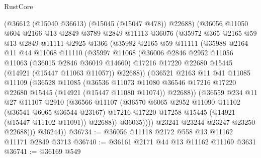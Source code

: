 \begin{lexlean}{RustCore}
\begin{coremodule}
          (@36612 (@15040 @36613) (@15045 (@15047 @478)) @22688)
          (@36056
            @11050
            @604
            @2166
            @13
            @2849
            @3789
            @2849
            @11113
            @36076
            (@35972
              @365
              @2165
              @59
              @13
              @2849
              @11111
              @2925
              @1366
              (@35982
                @2165
                @59
                @11111
                (@35988
                  @2164
                  @11
                  @44
                  @11068
                  @11110
                  (@35997
                    @11068
                    (@36006
                      @2846
                      @2952
                      @11056
                      @11063
                      (@36015 @2846 @36019 @14660)
                      @17216
                      @17220
                      @22680
                      @15445
                      (@14921 (@15447 @11063 @11057))
                      @22688))
                  (@36521
                    @2163
                    @11
                    @41
                    @11085
                    @11109
                    (@36528
                      @11085
                      (@36536
                        @11073
                        @11080
                        @36546
                        @17216
                        @17220
                        @22680
                        @15445
                        (@14921 (@15447 @11080 @11074))
                        @22688))
                    (@36559
                      @234
                      @11
                      @27
                      @11107
                      @2910
                      (@36566
                        @11107
                        (@36570
                          @6065
                          @2952
                          @11090
                          @11102
                          (@36541 @6065 @36544 @23167)
                          @17216
                          @17220
                          @17258
                          @15445
                          (@14921 (@15447 @11102 @11091))
                          @22688))
                      @36035))))
              @23241
              @23244
              @23247
              @23250
              @22688)))
        @36244))
@36734 := @36056 @11118 @2172 @558 @13 @11162 @11171 @2849 @3713
@36740 := @36161 @2171 @44 @13 @11162 @11169 @3631
@36741 := @36169 @549

\end{coremodule}
\end{lexlean}
